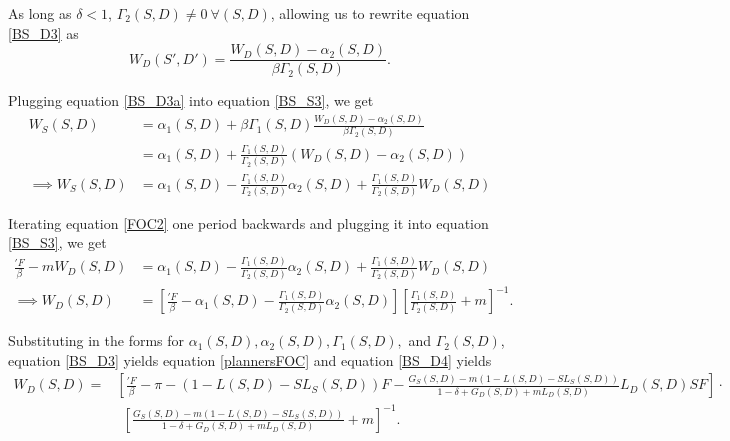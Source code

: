 \documentclass[9pt,twoside,lineno]{pnas-new}
\begin{document}
As long as $\delta < 1$, $\Gamma_2(S,D) \neq 0 ~\forall (S,D)$, allowing us to rewrite equation \ref{BS_D3} as
\begin{equation}
\label{BS_D3a}
W_D(S',D') = \frac{W_D(S,D) - \alpha_2(S,D)}{\beta \Gamma_2(S,D)}.
\end{equation}

Plugging equation \ref{BS_D3a} into equation \ref{BS_S3}, we get
\begin{align}
W_S(S,D) &= \alpha_1(S,D) + \beta \Gamma_1(S,D) \frac{W_D(S,D) - \alpha_2(S,D)}{\beta \Gamma_2(S,D)} \nonumber \\
&= \alpha_1(S,D) + \frac{\Gamma_1(S,D)}{\Gamma_2(S,D)} (W_D(S,D) - \alpha_2(S,D)) \nonumber \\
\label{BS_S3a}
\implies W_S(S,D) &= \alpha_1(S,D) - \frac{\Gamma_1(S,D)}{\Gamma_2(S,D)}\alpha_2(S,D) + \frac{\Gamma_1(S,D)}{\Gamma_2(S,D)} W_D(S,D) 
\end{align}

Iterating equation \ref{FOC2} one period backwards and plugging it into equation \ref{BS_S3}, we get
\begin{align}
\frac{'F}{\beta} - m W_D(S,D) &= \alpha_1(S,D) - \frac{\Gamma_1(S,D)}{\Gamma_2(S,D)}\alpha_2(S,D) + \frac{\Gamma_1(S,D)}{\Gamma_2(S,D)} W_D(S,D) \nonumber \\
\label{BS_D4}
\implies W_D(S,D) &= \left[ \frac{'F}{\beta} -  \alpha_1(S,D) - \frac{\Gamma_1(S,D)}{\Gamma_2(S,D)}\alpha_2(S,D) \right] \left[ \frac{\Gamma_1(S,D)}{\Gamma_2(S,D)} + m \right]^{-1}.
\end{align}

Substituting in the forms for $\alpha_1(S,D), \alpha_2(S,D), \Gamma_1(S,D),$ and $\Gamma_2(S,D)$, equation \ref{BS_D3} yields equation \ref{plannersFOC} and equation \ref{BS_D4} yields
\begin{align}
\label{W_Dformula}
W_D(S,D) =& \left[ \frac{'F}{\beta} - \pi - (1 - L(S,D) - S L_S(S,D))F - \frac{G_S(S,D) - m(1 - L(S,D) - SL_S(S,D))}{1 - \delta + G_D(S,D) + m L_D(S,D)}L_D(S,D) S F  \right] \cdot \nonumber \\
& ~~ \left[ \frac{G_S(S,D) - m(1 - L(S,D) - SL_S(S,D))}{1 - \delta + G_D(S,D) + m L_D(S,D)} + m \right]^{-1}.
\end{align}
\end{document}
